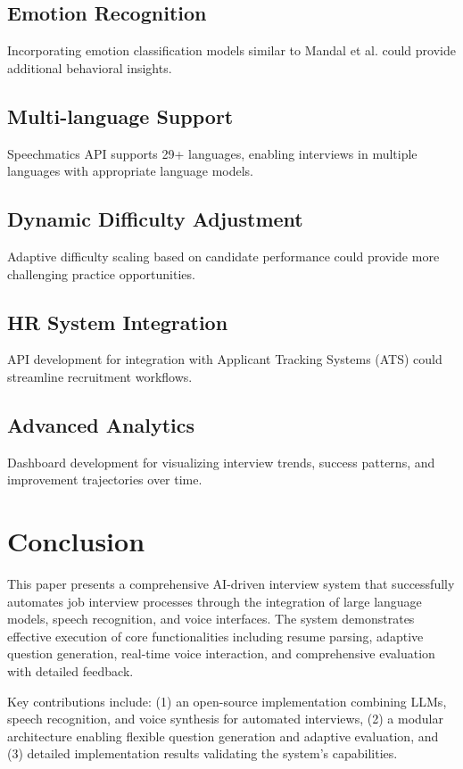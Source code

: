 \documentclass[conference]{IEEEtran}
\begin{document}
\subsection{Emotion Recognition}
Incorporating emotion classification models similar to Mandal et al. \cite{mandal2023emotion} could provide additional behavioral insights.

\subsection{Multi-language Support}
Speechmatics API supports 29+ languages, enabling interviews in multiple languages with appropriate language models.

\subsection{Dynamic Difficulty Adjustment}
Adaptive difficulty scaling based on candidate performance could provide more challenging practice opportunities.

\subsection{HR System Integration}
API development for integration with Applicant Tracking Systems (ATS) could streamline recruitment workflows.

\subsection{Advanced Analytics}
Dashboard development for visualizing interview trends, success patterns, and improvement trajectories over time.

\section{Conclusion}

This paper presents a comprehensive AI-driven interview system that successfully automates job interview processes through the integration of large language models, speech recognition, and voice interfaces. The system demonstrates effective execution of core functionalities including resume parsing, adaptive question generation, real-time voice interaction, and comprehensive evaluation with detailed feedback.

Key contributions include: (1) an open-source implementation combining LLMs, speech recognition, and voice synthesis for automated interviews, (2) a modular architecture enabling flexible question generation and adaptive evaluation, and (3) detailed implementation results validating the system's capabilities.
\end{document}
